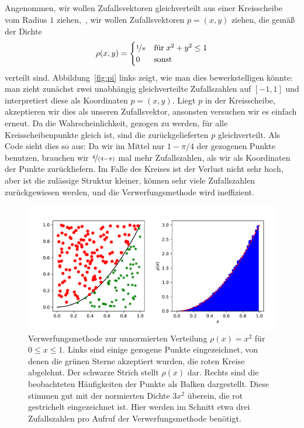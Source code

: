 \subsection{}

Angenommen, wir wollen Zufallsvektoren gleichverteilt aus einer
Kreisscheibe vom Radius $1$ ziehen, \dh\,, wir wollen Zufallsvektoren
$p=(x,y)$ ziehen, die gemäß der Dichte
\begin{equation}
  \rho(x, y) = \begin{cases}
    \nicefrac{1}{\pi} & \text{für}\; x^2+y^2\le 1\\
    0     & \text{sonst}
  \end{cases}
\end{equation}
verteilt sind.  Abbildung~\ref{fig:pi} links zeigt, wie man dies
bewerkstelligen könnte: man zieht zunächst zwei unabhängig
gleichverteilte Zufallszahlen auf $[-1,1]$ und interpretiert diese als
Koordinaten $p = (x, y)$. Liegt $p$ in der Kreisscheibe, akzeptieren
wir dies als unseren Zufallsvektor, ansonsten versuchen wir es einfach
erneut. Da die Wahrscheinlichkeit, gezogen zu werden, für alle
Kreisscheibenpunkte gleich ist, sind die zurückgelieferten $p$
gleichverteilt. Als Code sieht dies so aus:
%
Da wir im Mittel nur $1-\pi/4$ der gezogenen Punkte benutzen, brauchen
wir $\nicefrac{4}{(4-\pi)}$ mal mehr Zufallszahlen, als wir als
Koordinaten der Punkte zurückliefern. Im Falle des Kreises ist der
Verlust nicht sehr hoch, aber ist die zulässige Struktur kleiner,
können sehr viele Zufallszahlen zurückgewiesen werden, und die
Verwerfungsmethode wird ineffizient.

\begin{figure}
  \centering
  \includegraphics[width=\textwidth]{plots/rejection}
  \caption{Verwerfungsmethode zur unnormierten Verteilung
    $\rho(x)=x^2$ für $0\le x \le 1$. Links sind einige gezogene
    Punkte eingezeichnet, von denen die grünen Sterne akzeptiert
    wurden, die roten Kreise abgelehnt. Der schwarze Strich stellt
    $\rho(x)$ dar. Rechts sind die beobachteten Häufigkeiten der
    Punkte als Balken dargestellt. Diese stimmen gut mit der
    normierten Dichte $3x^2$ überein, die rot gestrichelt
    eingezeichnet ist. Hier werden im Schnitt etwa drei Zufallszahlen
    pro Aufruf der Verwerfungsmethode benötigt.}
  \label{fig:rejection}
\end{figure}

